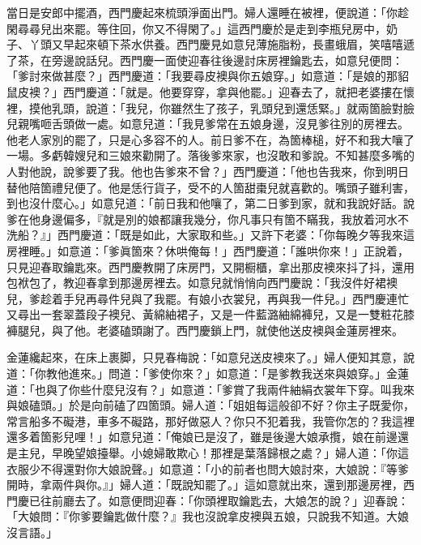 當日是安郎中擺酒，西門慶起來梳頭淨面出門。婦人還睡在被裡，便說道：「你趁閑尋尋兒出來罷。等住回，你又不得閑了。」{}這西門慶於是走到李瓶兒房中，奶子、丫頭又早起來頓下茶水供養。西門慶見如意兒薄施脂粉，長畫蛾眉，笑嘻嘻遞了茶，在旁邊說話兒。西門慶一面使迎春往後邊討床房裡鑰匙去，如意兒便問：「爹討來做甚麼？」西門慶道：「我要尋皮襖與你五娘穿。」如意道：「是娘的那貂鼠皮襖？」西門慶道：「就是。他要穿穿，拿與他罷。」迎春去了，就把老婆摟在懷裡，摸他乳頭，說道：「我兒，你雖然生了孩子，乳頭兒到還恁緊。」就兩箇臉對臉兒親嘴咂舌頭做一處。如意兒道：「我見爹常在五娘身邊，沒見爹往別的房裡去。{}他老人家別的罷了，只是心多容不的人。前日爹不在，為箇棒槌，好不和我大嚷了一場。多虧韓嫂兒和三娘來勸開了。落後爹來家，也沒敢和爹說。不知甚麼多嘴的人對他說，說爹要了我。他也告爹來不曾？」西門慶道：「他也告我來，你到明日替他陪箇禮兒便了。他是恁行貨子，受不的人箇甜棗兒就喜歡的。{}嘴頭子雖利害，到也沒什麼心。」如意兒道：「前日我和他嚷了，第二日爹到家，就和我說好話。說爹在他身邊偏多，『就是別的娘都讓我幾分，你凡事只有箇不瞞我，我放着河水不洗船？』」西門慶道：「既是如此，大家取和些。」{}又許下老婆：「你每晚夕等我來這房裡睡。」如意道：「爹眞箇來？休哄俺每！」西門慶道：「誰哄你來！」正說着，只見迎春取鑰匙來。西門慶教開了床房門，又開橱櫃，拿出那皮襖來抖了抖，還用包袱包了，教迎春拿到那邊房裡去。如意兒就悄悄向西門慶說：{}「我沒件好裙襖兒，爹趁着手兒再尋件兒與了我罷。有娘小衣裳兒，再與我一件兒。」西門慶連忙又尋出一套翠蓋段子襖兒、黃綿紬裙子，又是一件藍潞紬綿褲兒，又是一雙粧花膝褲腿兒，與了他。老婆磕頭謝了。西門慶鎖上門，就使他送皮襖與金蓮房裡來。

金蓮纔起來，在床上裹脚，只見春梅說：「如意兒送皮襖來了。」婦人便知其意，說道：「你教他進來。」問道：「爹使你來？」如意道：「是爹教我送來與娘穿。」金蓮道：「也與了你些什麼兒沒有？」{}如意道：「爹賞了我兩件紬絹衣裳年下穿。叫我來與娘磕頭。」於是向前磕了四箇頭。{}婦人道：「姐姐每這般卻不好？你主子既愛你，常言船多不礙港，車多不礙路，那好做惡人？你只不犯着我，我管你怎的？我這裡還多着箇影兒哩！」如意兒道：「俺娘已是沒了，雖是後邊大娘承攬，娘在前邊還是主兒，早晚望娘擡舉。小媳婦敢欺心！那裡是葉落歸根之處？」婦人道：「你這衣服少不得還對你大娘說聲。」如意道：「小的前者也問大娘討來，大娘說：『等爹開時，拿兩件與你。』」婦人道：「既說知罷了。」這如意就出來，還到那邊房裡，西門慶已往前廳去了。如意便問迎春：「你頭裡取鑰匙去，大娘怎的說？」迎春說：「大娘問：『你爹要鑰匙做什麼？』我也沒說拿皮襖與五娘，只說我不知道。大娘沒言語。」{}

